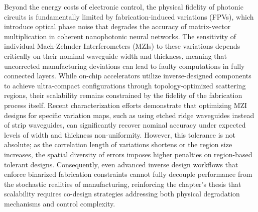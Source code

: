 Beyond the energy costs of electronic control, the physical fidelity of photonic circuits is fundamentally limited by fabrication-induced variations (FPVs), which introduce optical phase noise that degrades the accuracy of matrix-vector multiplication in coherent nanophotonic neural networks. The sensitivity of individual Mach-Zehnder Interferometers (MZIs) to these variations depends critically on their nominal waveguide width and thickness, meaning that uncorrected manufacturing deviations can lead to faulty computations in fully connected layers. While on-chip accelerators utilize inverse-designed components to achieve ultra-compact configurations through topology-optimized scattering regions, their scalability remains constrained by the fidelity of the fabrication process itself. Recent characterization efforts demonstrate that optimizing MZI designs for specific variation maps, such as using etched ridge waveguides instead of strip waveguides, can significantly recover nominal accuracy under expected levels of width and thickness non-uniformity. However, this tolerance is not absolute; as the correlation length of variations shortens or the region size increases, the spatial diversity of errors imposes higher penalties on region-based tolerant designs. Consequently, even advanced inverse design workflows that enforce binarized fabrication constraints cannot fully decouple performance from the stochastic realities of manufacturing, reinforcing the chapter's thesis that scalability requires co-design strategies addressing both physical degradation mechanisms and control complexity. \citep{doi_10_1109_tnano_2022_3223915_d4da3e6b} \citep{doi_10_1038_s41467_026_68648_1_26658a9c}

